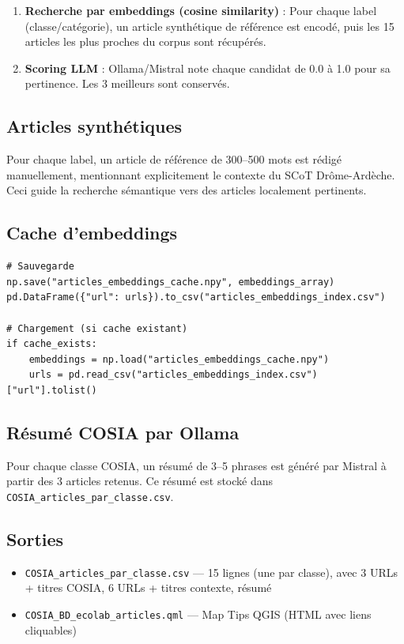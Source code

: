 \documentclass[12pt,a4paper]{report}
\newcommand{\code}[1]{\texttt{\small #1}}
\begin{document}
\begin{enumerate}
  \item \textbf{Recherche par embeddings (cosine similarity)} : Pour chaque label (classe/catégorie), un article synthétique de référence est encodé, puis les 15 articles les plus proches du corpus sont récupérés.
  \item \textbf{Scoring LLM} : Ollama/Mistral note chaque candidat de 0.0 à 1.0 pour sa pertinence. Les 3 meilleurs sont conservés.
\end{enumerate}

\subsection{Articles synthétiques}

Pour chaque label, un article de référence de 300–500 mots est rédigé manuellement, mentionnant explicitement le contexte du SCoT Drôme-Ardèche. Ceci guide la recherche sémantique vers des articles localement pertinents.

\subsection{Cache d'embeddings}

\begin{lstlisting}[language=Python3, caption={Système de cache d'embeddings}]
# Sauvegarde
np.save("articles_embeddings_cache.npy", embeddings_array)
pd.DataFrame({"url": urls}).to_csv("articles_embeddings_index.csv")

# Chargement (si cache existant)
if cache_exists:
    embeddings = np.load("articles_embeddings_cache.npy")
    urls = pd.read_csv("articles_embeddings_index.csv")["url"].tolist()
\end{lstlisting}

\subsection{Résumé COSIA par Ollama}

Pour chaque classe COSIA, un résumé de 3–5 phrases est généré par Mistral à partir des 3 articles retenus. Ce résumé est stocké dans \code{COSIA\_articles\_par\_classe.csv}.

\subsection{Sorties}

\begin{itemize}
  \item \code{COSIA\_articles\_par\_classe.csv} — 15 lignes (une par classe), avec 3 URLs + titres COSIA, 6 URLs + titres contexte, résumé
  \item \code{COSIA\_BD\_ecolab\_articles.qml} — Map Tips QGIS (HTML avec liens cliquables)
\end{itemize}
\end{document}
